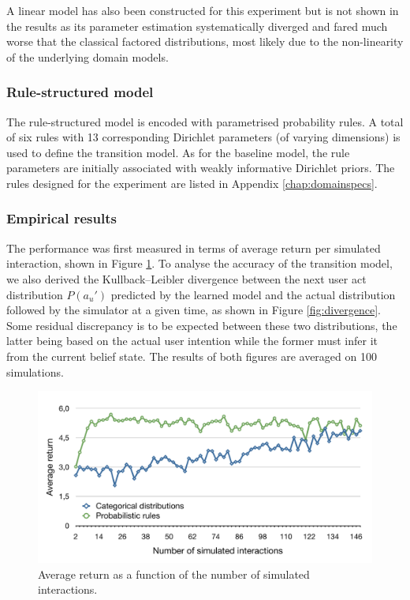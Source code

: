 A linear model has also been constructed for this experiment but is not shown in the results as its parameter estimation systematically diverged and fared much worse that the classical factored distributions, most likely due to the non-linearity of the underlying domain models. 


\subsubsection*{Rule-structured model}

The rule-structured model is encoded with parametrised probability rules. A total of six rules with 13 corresponding Dirichlet parameters (of varying dimensions) is used to define the transition model.   As for the baseline model, the rule parameters are initially associated with weakly informative Dirichlet priors.  The rules designed for the experiment are listed in Appendix \ref{chap:domainspecs}.

\subsubsection*{Empirical results}

The performance was first measured in terms of average return per simulated interaction, shown in Figure \ref{fig:return_exp21}.  To analyse the accuracy of the transition model, we also derived the Kullback--Leibler divergence \citep{KLDIVERGE} between the next user act distribution $P(a_u')$ predicted by the learned model and the actual distribution followed by the simulator at a given time, as shown in Figure \ref{fig:divergence}.   Some residual discrepancy is to be expected between these two distributions, the latter being based on the actual user intention while the former must infer it from the current belief state. The results of both figures are averaged on 100 simulations.

\begin{figure}[p]
\centering
\includegraphics[scale=0.42]{imgs/return_exp21.pdf}
\caption{Average return as a function of the number of simulated interactions.}
\label{fig:return_exp21}
\end{figure}


